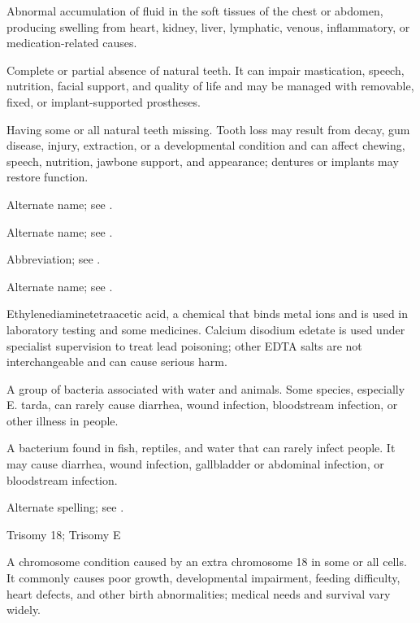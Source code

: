  Abnormal accumulation of fluid in the soft tissues of the chest or abdomen, producing swelling from heart, kidney, liver, lymphatic, venous, inflammatory, or medication-related causes.

 Complete or partial absence of natural teeth. It can impair mastication, speech,
nutrition, facial support, and quality of life and may be managed with removable, fixed,
or implant-supported prostheses.

 Having some or all natural teeth missing. Tooth loss may result from decay, gum disease, injury, extraction, or a developmental condition and can affect chewing, speech, nutrition, jawbone support, and appearance; dentures or implants may restore function.

 Alternate name; see .

 Alternate name; see .

 Abbreviation; see .

 Alternate name; see .

 Ethylenediaminetetraacetic acid, a chemical that binds metal ions and is used in laboratory testing and some medicines. Calcium disodium edetate is used under specialist supervision to treat lead poisoning; other EDTA salts are not interchangeable and can cause serious harm.

 A group of bacteria associated with water and animals. Some species, especially E. tarda, can rarely cause diarrhea, wound infection, bloodstream infection, or other illness in people.

 A bacterium found in fish, reptiles, and water that can rarely infect people. It may cause diarrhea, wound infection, gallbladder or abdominal infection, or bloodstream infection.

 Alternate spelling; see .

\synonyms
Trisomy 18; Trisomy E

 A chromosome condition caused by an extra chromosome 18 in some or all cells. It commonly causes poor growth, developmental impairment, feeding difficulty, heart defects, and other birth abnormalities; medical needs and survival vary widely.

